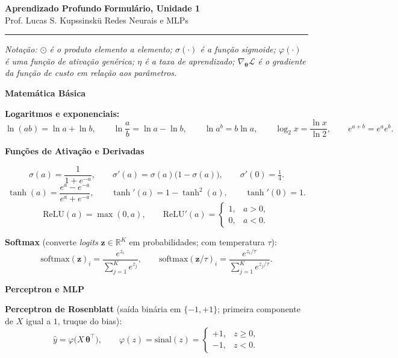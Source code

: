 \documentclass[11pt,a4paper]{article}
\newcommand{\thetav}{\boldsymbol{\theta}}
\newcommand{\bloco}[1]{%
  \par\vspace{0.3em}%
  {\bfseries\large #1}\par%
  \vspace{-0.4em}{\color{gray!60}\rule{\linewidth}{0.4pt}}\par%
}
\begin{document}
{\Large\bfseries Aprendizado Profundo} \hfill \textbf{Formulário, Unidade 1}\\
Prof. Lucas S. Kupssinskü \hfill Redes Neurais e MLPs

\rule{\linewidth}{0.8pt}

\textit{Notação: $\odot$ é o produto elemento a elemento; $\sigma(\cdot)$ é a função sigmoide; $\varphi(\cdot)$ é uma função de ativação genérica; $\eta$ é a taxa de aprendizado; $\nabla_{\thetav}\mathcal{L}$ é o gradiente da função de custo em relação aos parâmetros.}

\bloco{Matemática Básica}

\textbf{Logaritmos e exponenciais:}
\[
  \ln(ab) = \ln a + \ln b, \qquad
  \ln\frac{a}{b} = \ln a - \ln b, \qquad
  \ln a^{b} = b \ln a, \qquad
  \log_2 x = \frac{\ln x}{\ln 2}, \qquad
  e^{a+b} = e^{a} e^{b}.
\]

\bloco{Funções de Ativação e Derivadas}

\[
  \sigma(a) = \frac{1}{1 + e^{-a}}, \qquad
  \sigma'(a) = \sigma(a)\bigl(1 - \sigma(a)\bigr), \qquad
  \sigma'(0) = \tfrac{1}{4}.
\]
\[
  \tanh(a) = \frac{e^{a} - e^{-a}}{e^{a} + e^{-a}}, \qquad
  \tanh'(a) = 1 - \tanh^{2}(a), \qquad
  \tanh'(0) = 1.
\]
\[
  \mathrm{ReLU}(a) = \max(0, a), \qquad
  \mathrm{ReLU}'(a) =
  \begin{cases}
    1, & a > 0,\\
    0, & a < 0.
  \end{cases}
\]

\textbf{Softmax} (converte \textit{logits} $\mathbf{z} \in \mathbb{R}^{K}$ em probabilidades; com temperatura $\tau$):
\[
  \mathrm{softmax}(\mathbf{z})_i = \frac{e^{z_i}}{\sum_{j=1}^{K} e^{z_j}},
  \qquad
  \mathrm{softmax}(\mathbf{z}/\tau)_i = \frac{e^{z_i/\tau}}{\sum_{j=1}^{K} e^{z_j/\tau}}.
\]

\bloco{Perceptron e MLP}

\textbf{Perceptron de Rosenblatt} (saída binária em $\{-1, +1\}$; primeira componente de $X$ igual a $1$, truque do bias):
\[
  \hat{y} = \varphi\bigl(X\,\thetav^{\top}\bigr),
  \qquad
  \varphi(z) = \mathrm{sinal}(z) =
  \begin{cases}
    +1, & z \geq 0,\\
    -1, & z < 0.
  \end{cases}
\]
\end{document}
